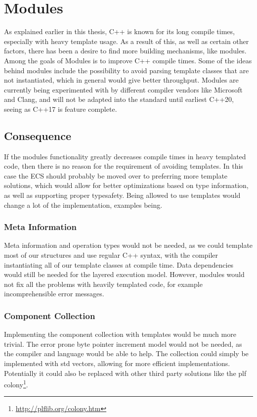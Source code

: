 \section{Modules}
\label{subsec:longevity_modules}
As explained earlier in this thesis, C++ is known
for its long compile times, especially with heavy template usage.
As a result of this, as well as certain other factors,
there has been a desire to find more building mechanisms, like modules.
Among the goals of Modules is to improve C++ compile times.
Some of the ideas behind modules include the possibility to avoid parsing
template classes that are not instantiated, which in general would give better throughput\cite[49:53]{cppcon_modules_state_of_the_union}.
Modules are currently being experimented with by different compiler vendors
like Microsoft\cite{microsoft_modules_support} and Clang\cite{clang_modules_support},
and will not be adapted into the standard until earliest C++20, seeing as C++17 is feature complete\cite{isocpp_standardization_status}.

\subsection{Consequence}
If the modules functionality greatly decreases compile times in heavy templated code,
then there is no reason for the requirement of avoiding templates.
In this case the ECS should probably be moved over to preferring more template solutions,
which would allow for better optimizations based on type information, as well as supporting
proper typesafety.
Being allowed to use templates would change a lot of the implementation, examples being.

\subsubsection{Meta Information}
Meta information and operation types
would not be needed, as we could template most of our structures and use regular C++ syntax,
with the compiler instantiating all of our template classes at compile time.
Data dependencies would still be needed for the layered execution model.
However, modules would not fix all the problems with heavily templated code,
for example incomprehensible error messages.

\subsubsection{Component Collection}
Implementing the component collection with templates would be much more trivial.
The error prone byte pointer increment model would not be needed, as the compiler
and language would be able to help.
The collection could simply be implemented with std vectors, allowing for more
efficient implementations.
Potentially it could also be replaced with other third party solutions like
the plf colony\footnote{\url{http://plflib.org/colony.htm}}.


